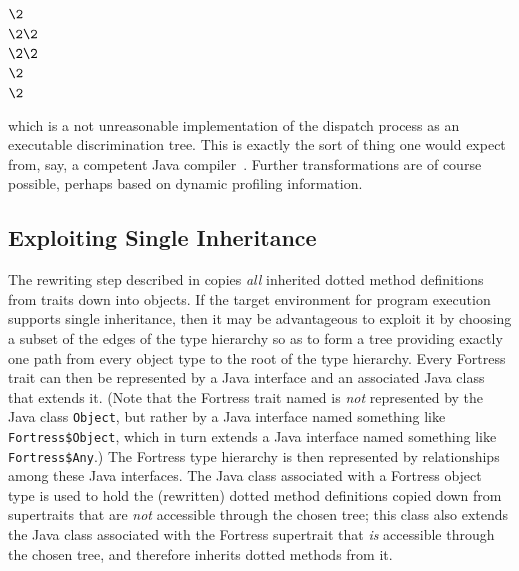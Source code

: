 \begin{codeexamplesize}
\begin{tabbing}
 \\
\(\2\) \\
\(\2\2\) \\
\(\2\2\) \\
\(\2\) \\
\(\2\)
\end{tabbing}
\end{codeexamplesize}
which is a not unreasonable implementation of the
dispatch process as an executable discrimination tree.
This is exactly the sort of thing one would expect
from, say, a competent Java compiler~\cite{JAVA-6-HOTSPOT-COMPILER}.
Further transformations are of course possible,
perhaps based on dynamic profiling information.

\subsection{Exploiting Single Inheritance}

The rewriting step described in 
copies \emph{all} inherited dotted method definitions from traits down
into objects.  If the target environment for program execution
supports single inheritance, then it may be advantageous to exploit it
by choosing a subset of the edges of the type hierarchy so as to form
a tree providing exactly one path from every object type to the
root of the type hierarchy.  Every Fortress trait can then be represented
by a Java interface and an associated Java class that extends it.
(Note that the Fortress trait named  is \emph{not} represented by
the Java class {\tt Object}, but rather by a Java interface
named something like {\tt Fortress\$Object}, which in turn
extends a Java interface named something like {\tt Fortress\$Any}.)
The Fortress type hierarchy is then represented by 
relationships among these Java interfaces.
The Java class associated with a Fortress object type
is used to hold the (rewritten) dotted method definitions copied
down from supertraits that are \emph{not} accessible through
the chosen tree; this class also extends the Java class
associated with the Fortress supertrait that \emph{is}
accessible through the chosen tree, and therefore inherits
dotted methods from it.

